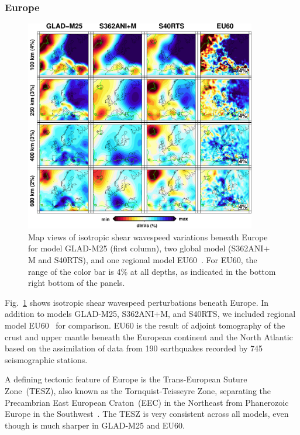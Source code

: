 \subsubsection{Europe}

\begin{figure}[ht!]
\includegraphics[width=0.9\textwidth]{ch-GLADM25/figures/depth_slice/europe_vs.pdf}
  \caption[Map views of isotropic shear wavespeed variations beneath Europe]
  {\small{Map views of isotropic shear wavespeed variations beneath Europe for model GLAD-M25 (first column), two global model (S362ANI$+$M and S40RTS), and
  one regional model EU60~\cite{zhu2015seismic}. For EU60, the range of the color
  bar is 4\% at all depths, as indicated in the bottom right bottom of the panels.}}
\label{fig:europe-vs}
\centering
\end{figure}

Fig.~\ref{fig:europe-vs} shows isotropic shear wavespeed perturbations beneath Europe.
In addition to models GLAD-M25, S362ANI$+$M, and S40RTS, we included regional
model EU60~\cite{zhu2015seismic} for comparison.
EU60 is the result of adjoint tomography of the crust and upper mantle
beneath the European continent and the North Atlantic based on the assimilation of data from
190 earthquakes recorded by 745 seismographic stations.

A defining tectonic feature of Europe is the Trans-European Suture Zone~(TESZ),
also known as the Tornquist-Teisseyre Zone,
separating the Precambrian East European Craton~(EEC) in the Northeast from
Phanerozoic Europe in the Southwest~\cite{zielhuis1994deep}.
The TESZ is very consistent across all models,
even though is much sharper in GLAD-M25 and EU60.

